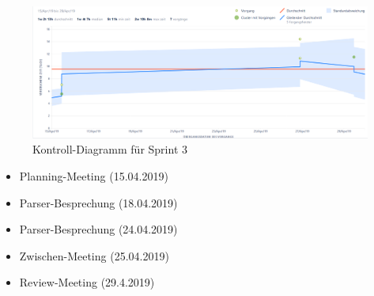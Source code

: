 \begin{figure}[hbtp]
\centering
\includegraphics[width=\textwidth]{Bilder/KD-Jira.png}
\caption{Kontroll-Diagramm für Sprint 3}
\end{figure}
\nsecend%

\begin{itemize}
\item Planning-Meeting (15.04.2019)
\item Parser-Besprechung (18.04.2019)
\item Parser-Besprechung (24.04.2019)
\item Zwischen-Meeting (25.04.2019)
\item Review-Meeting (29.4.2019)
\end{itemize}
\nsecend%

